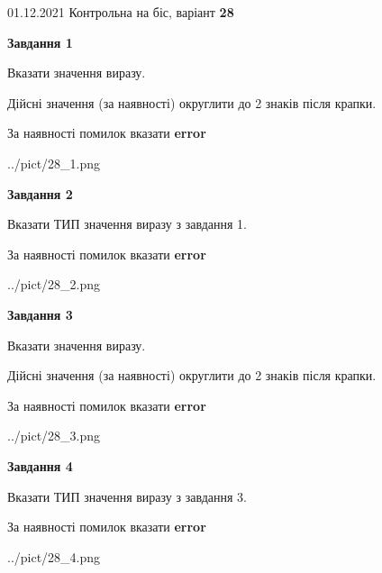 \documentclass[11pt, ukrainian]{article}
\begin{document}
{01.12.2021 Контрольна на біс, варіант  \No \textbf { 28 }\par}
{
\begin {large}
{\begin {center}\textbf{Завдання 1}\end {center}}\par
Вказати значення виразу. \par
Дійсні значення (за наявності) округлити до 2 знаків після крапки. \par
За наявності помилок вказати \textbf{error}

\begin{center}
	{../pict/28_1.png}
\end{center}
\newpage

{\begin {center}\textbf{Завдання 2}\end {center}}\par
Вказати ТИП значення виразу з завдання 1. \par
За наявності помилок вказати \textbf{error}

\begin{center}
	{../pict/28_2.png}
\end{center}
\newpage

{\begin {center}\textbf{Завдання 3}\end {center}}\par
Вказати значення виразу. \par
Дійсні значення (за наявності) округлити до 2 знаків після крапки. \par
За наявності помилок вказати \textbf{error}

\begin{center}
	{../pict/28_3.png}
\end{center}
\newpage

{\begin {center}\textbf{Завдання 4}\end {center}}\par
Вказати ТИП значення виразу з завдання 3. \par
За наявності помилок вказати \textbf{error}

\begin{center}
	{../pict/28_4.png}
\end{center}
\newpage


\end{large}}
\end{document}
